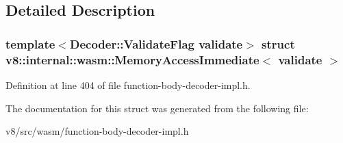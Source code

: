 \subsection{Detailed Description}
\subsubsection*{template$<$Decoder\+::\+Validate\+Flag validate$>$\newline
struct v8\+::internal\+::wasm\+::\+Memory\+Access\+Immediate$<$ validate $>$}



Definition at line 404 of file function-\/body-\/decoder-\/impl.\+h.



The documentation for this struct was generated from the following file\+:\begin{DoxyCompactItemize}
\item 
v8/src/wasm/function-\/body-\/decoder-\/impl.\+h\end{DoxyCompactItemize}
